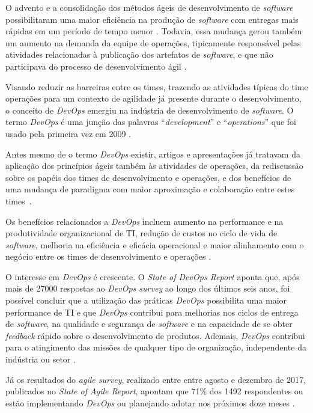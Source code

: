 O advento e a consolidação dos métodos ágeis de desenvolvimento de
\textit{software} possibilitaram uma maior eficiência na produção de
\textit{software} com entregas mais rápidas em um período de tempo menor
\cite{agile_sw_dev}. Todavia, essa mudança gerou também um aumento na demanda
da equipe de operações, tipicamente responsável pelas atividades relacionadas à
publicação dos artefatos de \textit{software}, e que não participava
do processo de desenvolvimento ágil \cite{humble2010continuous}.

Visando reduzir as barreiras entre os times, trazendo as atividades típicas
do time operações para um contexto de agilidade já presente durante o
desenvolvimento, o conceito de \textit{DevOps} emergiu na indústria de
desenvolvimento de \textit{software}. O termo \textit{DevOps} é uma
junção das palavras ``\textit{development}'' e ``\textit{operations}'' que
foi usado pela primeira vez em 2009 \cite{devops_for_developers}.

Antes mesmo de o termo \textit{DevOps} existir, artigos e apresentações
já tratavam da aplicação dos princípios ágeis também às atividades de operações,
da rediscussão sobre os papéis dos times de desenvolvimento e operações, e dos
benefícios de uma mudança de paradigma com maior aproximação e colaboração
entre estes times~\cite{devops_for_developers,agile_infra_operations,flickr}.

Os benefícios relacionados a \textit{DevOps} incluem aumento na performance
e na produtividade organizacional de \acrshort{TI}, redução de custos no ciclo de vida
de \textit{software}, melhoria na eficiência e eficácia operacional e maior
alinhamento com o negócio entre os times de desenvolvimento e operações
\cite{characterizing_devops}.

O interesse em {\it DevOps} é crescente. O \textit{State of DevOps Report}
aponta que, após mais de 27000 respostas ao \textit{DevOps survey} ao longo dos
últimos seis anos, foi possível concluir que a utilização das práticas \textit{DevOps}
possibilita uma maior performance de \acrshort{TI} e que \textit{DevOps} contribui para melhorias nos
ciclos de entrega de \textit{software}, na qualidade e segurança de \textit{software}
e na capacidade de se obter \textit{feedback} rápido sobre o desenvolvimento de produtos.
Ademais, \textit{DevOps} contribui para o atingimento das missões de qualquer
tipo de organização, independente da indústria ou setor \cite{state_of_devops}.

Já os resultados do \textit{agile survey}, realizado entre entre agosto e dezembro
de 2017, publicados no \textit{State of Agile Report}, apontam que 71\% dos 1492
respondentes ou estão implementando \textit{DevOps} ou planejando adotar nos
próximos doze meses \cite{state_of_agile}.

